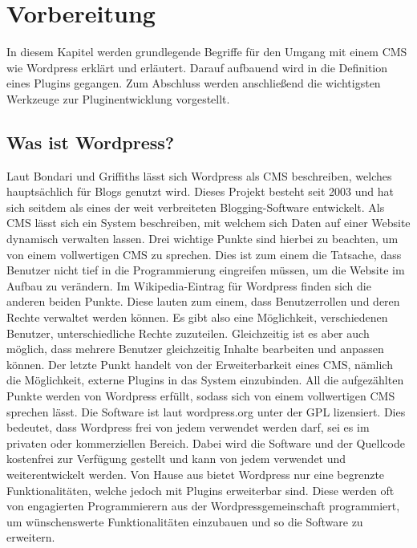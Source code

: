 \section{Vorbereitung}\label{Vorbereitung}
In diesem Kapitel werden grundlegende Begriffe für den Umgang mit einem \gls{CMS} wie Wordpress erklärt und erläutert. Darauf aufbauend wird in die Definition eines Plugins gegangen. Zum Abschluss werden anschließend die wichtigsten Werkzeuge zur Pluginentwicklung vorgestellt.
\subsection{Was ist Wordpress?}
Laut Bondari und Griffiths lässt sich Wordpress als \gls{CMS} beschreiben, welches hauptsächlich für Blogs genutzt wird. Dieses Projekt besteht seit 2003 und hat sich seitdem als eines der weit verbreiteten Blogging-Software entwickelt. \newline
Als \gls{CMS} lässt sich ein System beschreiben, mit welchem sich Daten auf einer Website dynamisch verwalten lassen. Drei wichtige Punkte sind hierbei zu beachten, um von einem vollwertigen \gls{CMS} zu sprechen. Dies ist zum einem die Tatsache, dass Benutzer nicht tief in die Programmierung eingreifen müssen, um die Website im Aufbau zu verändern.\newline
Im Wikipedia-Eintrag für Wordpress finden sich die anderen beiden Punkte. Diese lauten zum einem, dass Benutzerrollen und deren Rechte verwaltet werden können. Es gibt also eine Möglichkeit, verschiedenen Benutzer, unterschiedliche Rechte zuzuteilen. Gleichzeitig ist es aber auch möglich, dass mehrere Benutzer gleichzeitig Inhalte bearbeiten und anpassen können.\newline
Der letzte Punkt handelt von der Erweiterbarkeit eines \gls{CMS}, nämlich die Möglichkeit, externe Plugins in das System einzubinden. All die aufgezählten Punkte werden von Wordpress erfüllt, sodass sich von einem  vollwertigen CMS sprechen lässt. \newline
Die Software ist laut wordpress.org unter der \gls{GPL} lizensiert. Dies bedeutet, dass Wordpress frei von jedem verwendet werden darf, sei es im privaten oder kommerziellen Bereich. Dabei wird die Software und der Quellcode kostenfrei zur Verfügung gestellt und kann von jedem verwendet und weiterentwickelt werden.\newline
Von Hause aus bietet Wordpress nur eine begrenzte Funktionalitäten, welche jedoch mit Plugins erweiterbar sind. Diese werden oft von engagierten Programmierern aus der Wordpressgemeinschaft programmiert, um wünschenswerte Funktionalitäten einzubauen und so die Software zu erweitern.
